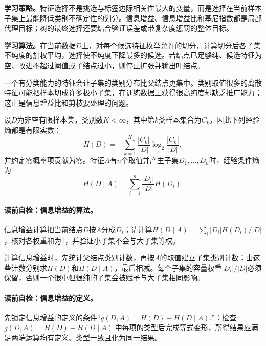 \label{struct:V2-C04-CH09}
\textbf{学习策略。}特征选择不是挑选与标签边际相关性最大的变量，而是选择在当前样本子集上最能降低类别不确定性的划分。信息增益、信息增益比和基尼指数都是局部代理目标；树的最终选择还要结合验证误差或带复杂度惩罚的整体目标。

\label{struct:V2-C04-CH10}
\textbf{学习算法。}在当前数据$D$上，对每个候选特征枚举允许的切分，计算切分后各子集不纯度的加权平均，选择使不纯度下降最多的候选。若结点已足够纯、候选特征为空、改进不超过阈值或子结点过小，则停止扩张并输出叶结点。

一个有分类能力的特征会让子集的类别分布比父结点更集中。类别取值很多的离散特征可能把样本切成许多极小子集，在训练数据上获得很高纯度却缺乏推广能力；这正是信息增益比和剪枝要处理的问题。


设$D$为非空有限样本集，类别数$K<\infty$，其中第$k$类样本集合为$C_k$。因此下列经验熵都是有限实数：
\[
H(D)=-\sum_{k=1}^{K}\frac{|C_k|}{|D|}\log_2\frac{|C_k|}{|D|},
\]
并约定零概率项贡献为零。特征$A$有$n$个取值并产生子集$D_1,\ldots,D_n$时，经验条件熵为
\[
H(D\mid A)=\sum_{i=1}^{n}\frac{|D_i|}{|D|}H(D_i).
\]

\paragraph{读前自检：信息增益的算法。}信息增益计算把当前结点$D$按$A$分成$D_i$；请计算$H(D\mid A)=\sum_i |D_i|H(D_i)/|D|$，核对各权重和为1，并验证小子集不会与大子集等权。\par

计算信息增益时，先统计父结点类别计数，再按$A$的取值建立子集类别计数；由这些计数分别求$H(D)$和$H(D\mid A)$，最后相减。每个子集的容量权重$|D_i|/|D|$必须保留，否则一个很小但很纯的子集会被赋予与大子集相同影响。

\paragraph{读前自检：信息增益的定义。}先锁定信息增益的定义的条件“$g(D,A)=H(D)-H(D\mid A).$”：检查$g(D,A)=H(D)-H(D\mid A).$中每项的类型后完成等式变形，所得结果应满足两端运算均有定义、类型一致且化为同一结果。\par

